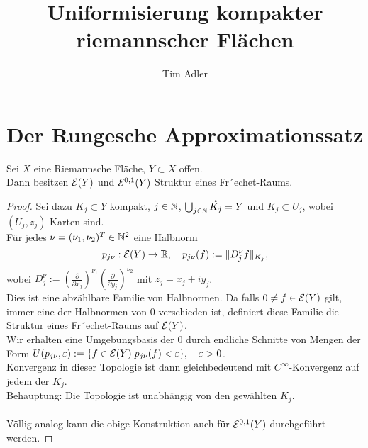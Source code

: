 
\title{Uniformisierung kompakter riemannscher Flächen}
\author{Tim Adler}





\section{Der Rungesche Approximationssatz}
\label{sec:Runge}


\begin{prop}
  Sei $X$ eine Riemannsche Fläche, $Y \subset X$ offen. \\
  Dann besitzen $\mathcal{E}(Y)$ und $\mathcal{E}^{0,1}(Y)$ Struktur eines Fr´echet-Raums.
\end{prop}

\begin{proof}
  Sei dazu $K_j \subset Y$ kompakt, $j \in \mathbb{N}$, $\bigcup_{j \in \mathbb{N}}
  \mathring{K_j} = Y$ und $K_j \subset U_j$, wobei $(U_j, z_j)$ Karten
  sind. \\
  Für jedes $\nu = (\nu_1, \nu_2)^T \in \mathbb{N}^2$ eine Halbnorm
  \[
  p_{j\nu}: \mathcal{E}(Y) \rightarrow \mathbb{R}, \quad p_{j\nu}(f) := \|D_j^\nu f\|_{K_j},
  \]
  wobei $D^\nu_j := \left ( \frac{\partial}{\partial x_j} \right
  )^{\nu_1} \left ( \frac{\partial}{\partial y_j} \right )^{\nu_2}$
  mit $z_j = x_j + iy_j$. \\
  Dies ist eine abzählbare Familie von Halbnormen. Da falls $0 \neq f
  \in \mathcal{E}(Y)$ gilt, immer eine der Halbnormen von 0 verschieden ist,
  definiert diese Familie die Struktur eines Fr´echet-Raums auf
  $\mathcal{E}(Y)$. \\
  Wir erhalten eine Umgebungsbasis der 0 durch endliche Schnitte von
  Mengen der Form $U(p_{j\nu}, \varepsilon) := \{f \in \mathcal{E}(Y) |
  p_{j\nu}(f) < \varepsilon \}, \quad \varepsilon > 0$. \\
  Konvergenz in dieser Topologie ist dann gleichbedeutend mit
  $C^\infty$-Konvergenz auf jedem der $K_j$. \\
  Behauptung: Die Topologie ist unabhängig von den gewählten $K_j$.\\
  \\
  Völlig analog kann die obige Konstruktion auch für $\mathcal{E}^{0,1}(Y)$
  durchgeführt werden.
\end{proof}


